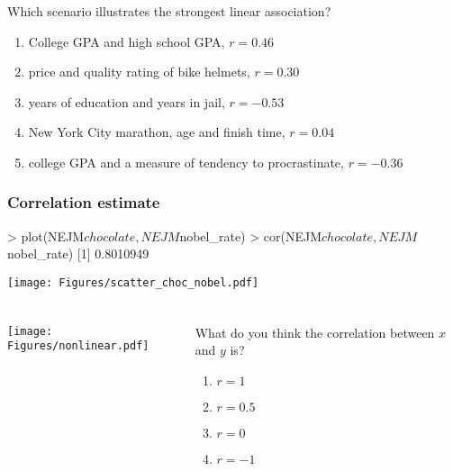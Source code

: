 \begin{frame}
\begin{clicker}{Which scenario illustrates the strongest linear association?}
\begin{enumerate}
    \item
    College GPA and high school GPA, $r=0.46$
    \item
    price and quality rating of bike helmets, $r=0.30$
    \item
    years of education and years in jail, $r=-0.53$
    \item
    New York City marathon, age and finish time, $r=0.04$
    \item
    college GPA and a measure of tendency to procrastinate, $r=-0.36$
\end{enumerate}
\end{clicker}
\end{frame}

\begin{frame}[fragile]
\frametitle{Correlation estimate}
\begin{lcverbatim}
> plot(NEJM$chocolate,NEJM$nobel_rate)
> cor(NEJM$chocolate,NEJM$nobel_rate)
[1] 0.8010949
\end{lcverbatim}
\texttt{[image: Figures/scatter\_choc\_nobel.pdf]}
\end{frame}

\begin{frame}
\frametitle{\grp}
\begin{columns}
\texttt{[image: Figures/nonlinear.pdf]}\\
\begin{clicker}{What do you think the correlation between $x$ and $y$ is?}
\begin{enumerate}
    \item
    $r=1$
    \item
    $r=0.5$
    \item
    $r=0$
    \item
    $r=-1$
\end{enumerate}
\end{clicker}
\end{columns}
\end{frame}


